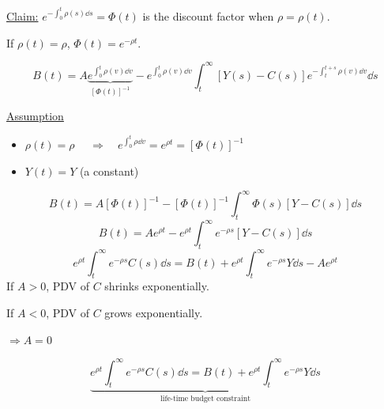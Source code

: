 \documentclass[twoside]{article}
\newcommand\imp{$\Longrightarrow$}
\begin{document}
\underline{Claim:}
$ e^{-\int_0^t \rho(s) \dd s } = \Phi(t)$ is the discount factor when $\rho = \rho(t)$.

If $\rho(t) = \rho$, $\Phi(t) = e^{-\rho t}$.

\begin{equation}
    B(t) = A \underbrace{e^{\int_0^t \rho(v) \dd v }}_{[\Phi(t)]^{-1}} - e^{\int_0^t \rho(v) \dd v } \int_t^{\infty} [ Y(s)-C(s)] e^{-\int_t^{t+s} \rho(v) \dd v } \dd s
\end{equation}

\underline{Assumption}
\begin{itemize}
    \item $\rho(t) = \rho \quad$ \imp $\quad e^{\int_0^t \rho \dd v} = e^{\rho t } = [\Phi(t)]^{-1} $
    \item $Y(t) = Y$ (a constant)
\end{itemize}
\begin{equation}
    B(t) = A [\Phi(t)]^{-1} - [\Phi(t)]^{-1} \int_t^{\infty} \Phi(s) [ Y-C(s)] \dd s
\end{equation}
\begin{equation}
    B(t) = A e^{\rho t} - e^{\rho t} \int_t^{\infty} e^{ - \rho s} [ Y-C(s)] \dd s
\end{equation}
\begin{equation}
    e^{\rho t} \int_t^{\infty} e^{ - \rho s} C(s) \dd s = B(t) + e^{\rho t} \int_t^{\infty} e^{ - \rho s} Y \dd s - A e^{\rho t} 
\end{equation}
If $A >0$, PDV of $C$ shrinks exponentially.

If $A <0$, PDV of $C$ grows exponentially.

\imp $A = 0$

\begin{equation}
    \underbrace{e^{\rho t} \int_t^{\infty} e^{ - \rho s} C(s) \dd s = B(t) + e^{\rho t} \int_t^{\infty} e^{ - \rho s} Y \dd s  }_{\text{life-time budget constraint}}
\end{equation}
\end{document}
